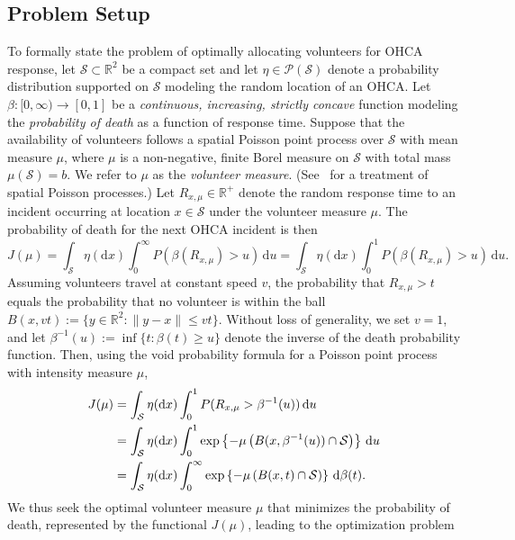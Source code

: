 \documentclass[stsy,sglanonrev]{informs4}
\newcommand{\death}{{\beta}}
\begin{document}
\subsection{Problem Setup}
To formally state the problem of optimally allocating volunteers for OHCA response, let $\mathcal{S} \subset \mathbb{R}^2$ be a compact set and let $\eta \in \mathcal{P}(\mathcal{S})$ denote a probability distribution supported on $\mathcal{S}$ modeling the random location of an OHCA. Let $\beta: [0,\infty) \to [0,1]$ be a \emph{continuous, increasing, strictly concave} function modeling the \emph{probability of death} as a function of response time. Suppose that the availability of volunteers follows a spatial Poisson point process over $\mathcal{S}$ with mean measure $\mu$, where $\mu$ is a non-negative, finite Borel measure on \( \mathcal{S} \) with total mass \( \mu(\mathcal{S}) = b \). We refer to $\mu$ as the \emph{volunteer measure}.  (See~\cite{res1987} for a treatment of spatial Poisson processes.) Let \( R_{x,\mu} \in \mathbb{R}^+ \) denote the random response time to an incident occurring at location \( x \in \mathcal{S} \) under the volunteer measure \( \mu \). The probability of death for the next OHCA incident is then
\begin{equation}\label{obj}
J(\mu) = \int_{\mathcal{S}} \eta(\mbox{d}x)\int_0^{\infty} P(\death(R_{x,\mu}) > u) \, \mbox{d}u = \int_{\mathcal{S}} \eta(\mbox{d}x)\int_0^{1} P(\death(R_{x,\mu}) > u) \, \mbox{d}u. \end{equation}
Assuming volunteers travel at constant speed \( v \), the probability that \( R_{x,\mu} > t \) equals the probability that no volunteer is within the ball \( B(x,vt) := \{ y \in \mathbb{R}^2 : \|y - x\| \leq vt \} \). Without loss of generality, we set \( v = 1 \), and let \( \death^{-1}(u) := \inf\{ t : \death(t) \geq u \} \) denote the inverse of the death probability function. Then, using the void probability formula for a Poisson point process with intensity measure \( \mu \),
\begin{align}\label{objexp}
J(\mu)
&= \int_{\mathcal{S}} \eta(\mathrm{d}x) \int_0^1 P(R_{x,\mu} > \death^{-1}(u)) \, \mathrm{d}u \notag \\
&= \int_{\mathcal{S}} \eta(\mathrm{d}x) \int_0^1 \exp\left\{-\mu\left(B(x, \death^{-1}(u)) \cap \mathcal{S}\right)\right\} \, \mathrm{d}u \notag \\
&= \int_{\mathcal{S}} \eta(\mathrm{d}x) \int_0^{\infty} \exp\left\{-\mu\left(B(x, t) \cap \mathcal{S}\right)\right\} \, \mathrm{d}\death(t).
\end{align} We thus seek the optimal volunteer measure $\mu$ that minimizes the  probability of death, represented by the functional \( J(\mu) \), leading to the optimization problem
\end{document}
